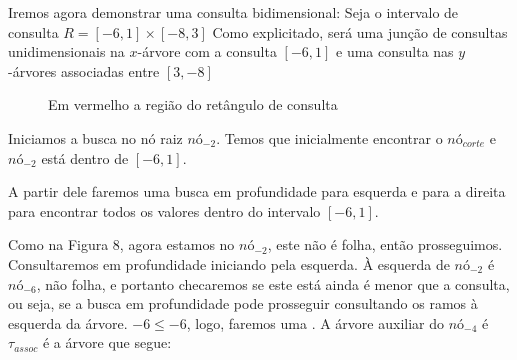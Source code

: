 Iremos agora demonstrar uma consulta bidimensional:
Seja o intervalo de consulta $R = [-6, 1] \times [-8, 3]$
Como explicitado, será uma junção de consultas unidimensionais na $x$-árvore com a consulta $[-6,1]$ e uma consulta nas $y$-árvores associadas entre $[3,-8]$

\begin{figure}[h]

    \centering
{}
\caption {Em vermelho a região do retângulo de consulta}
\end{figure}

Iniciamos a busca no nó raiz $nó_{-2}$. Temos que inicialmente encontrar o $nó_{corte}$ e $nó_{-2}$ está dentro de $[-6, 1]$. 


A partir dele faremos uma busca em profundidade para esquerda e para a direita para encontrar todos 
os valores dentro do intervalo $[-6,1]$. 

Como na Figura 8, agora estamos no $nó_{-2}$, este não é folha, então prosseguimos.
Consultaremos em profundidade iniciando pela esquerda. À esquerda de $nó_{-2}$ é $nó_{-6}$, não folha, e portanto checaremos se este está ainda é menor que a consulta, ou seja, se a busca em profundidade pode prosseguir consultando os ramos à esquerda da árvore. $-6 \leq -6$, logo, faremos uma . A árvore auxiliar do $nó_{-4}$ é $\tau_{assoc}$ é a árvore que segue:


